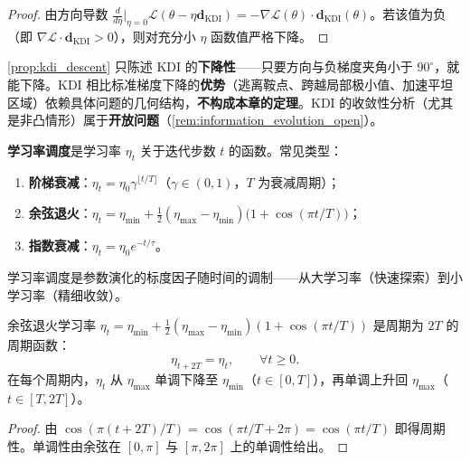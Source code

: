 \begin{proof}
由方向导数 $\frac{d}{d\eta}\big|_{\eta=0}\mathcal{L}(\theta-\eta\mathbf{d}_{\text{KDI}}) = -\nabla\mathcal{L}(\theta)\cdot\mathbf{d}_{\text{KDI}}(\theta)$。若该值为负（即 $\nabla\mathcal{L}\cdot\mathbf{d}_{\text{KDI}} > 0$），则对充分小 $\eta$ 函数值严格下降。
\end{proof}

\begin{remark}\label{rem:kdi_boundary}
\cref{prop:kdi_descent} 只陈述 KDI 的\textbf{下降性}——只要方向与负梯度夹角小于 $90^\circ$，就能下降。KDI 相比标准梯度下降的\textbf{优势}（逃离鞍点、跨越局部极小值、加速平坦区域）依赖具体问题的几何结构，\textbf{不构成本章的定理}。KDI 的收敛性分析（尤其是非凸情形）属于\textbf{开放问题}（\cref{rem:information_evolution_open}）。
\end{remark}

\begin{definition}[学习率调度]\label{def:learning_rate_schedule}
\textbf{学习率调度}是学习率 $\eta_t$ 关于迭代步数 $t$ 的函数。常见类型：
\begin{enumerate}[label=(\roman*)]
    \item \textbf{阶梯衰减}：$\eta_t = \eta_0\gamma^{\lfloor t/T\rfloor}$（$\gamma\in(0,1)$，$T$ 为衰减周期）；
    \item \textbf{余弦退火}：$\eta_t = \eta_{\min} + \frac{1}{2}(\eta_{\max}-\eta_{\min})\bigl(1+\cos(\pi t/T)\bigr)$；
    \item \textbf{指数衰减}：$\eta_t = \eta_0 e^{-t/\tau}$。
\end{enumerate}
学习率调度是参数演化的标度因子随时间的调制——从大学习率（快速探索）到小学习率（精细收敛）。
\end{definition}

\begin{proposition}[余弦退火学习率的周期结构]\label{prop:cosine_annealing_period}
余弦退火学习率 $\eta_t = \eta_{\min} + \frac{1}{2}(\eta_{\max}-\eta_{\min})(1+\cos(\pi t/T))$ 是周期为 $2T$ 的周期函数：
\[
\eta_{t+2T} = \eta_t, \qquad \forall t\ge 0.
\]
在每个周期内，$\eta_t$ 从 $\eta_{\max}$ 单调下降至 $\eta_{\min}$（$t\in[0,T]$），再单调上升回 $\eta_{\max}$（$t\in[T,2T]$）。
\end{proposition}

\begin{proof}
由 $\cos(\pi(t+2T)/T) = \cos(\pi t/T + 2\pi) = \cos(\pi t/T)$ 即得周期性。单调性由余弦在 $[0,\pi]$ 与 $[\pi,2\pi]$ 上的单调性给出。
\end{proof}

